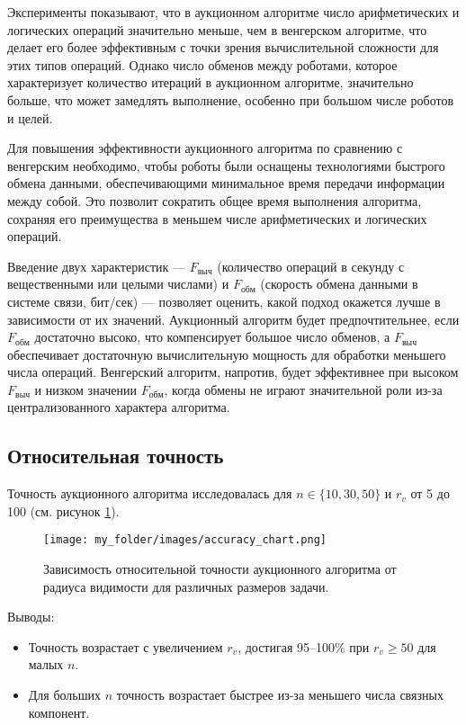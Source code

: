 \vspace{0.3cm}

Эксперименты показывают, что в аукционном алгоритме число арифметических и логических операций значительно меньше, чем в венгерском алгоритме, что делает его более эффективным с точки зрения вычислительной сложности для этих типов операций. Однако число обменов между роботами, которое характеризует количество итераций в аукционном алгоритме, значительно больше, что может замедлять выполнение, особенно при большом числе роботов и целей.

Для повышения эффективности аукционного алгоритма по сравнению с венгерским необходимо, чтобы роботы были оснащены технологиями быстрого обмена данными, обеспечивающими минимальное время передачи информации между собой. Это позволит сократить общее время выполнения алгоритма, сохраняя его преимущества в меньшем числе арифметических и логических операций.

Введение двух характеристик — \( F_{\text{выч}} \) (количество операций в секунду с вещественными или целыми числами) и \( F_{\text{обм}} \) (скорость обмена данными в системе связи, бит/сек) — позволяет оценить, какой подход окажется лучше в зависимости от их значений. Аукционный алгоритм будет предпочтительнее, если \( F_{\text{обм}} \) достаточно высоко, что компенсирует большое число обменов, а \( F_{\text{выч}} \) обеспечивает достаточную вычислительную мощность для обработки меньшего числа операций. Венгерский алгоритм, напротив, будет эффективнее при высоком \( F_{\text{выч}} \) и низком значении \( F_{\text{обм}} \), когда обмены не играют значительной роли из-за централизованного характера алгоритма.



\subsection{Относительная точность}
Точность аукционного алгоритма исследовалась для \( n \in \{10, 30, 50\} \) и \( r_v \) от 5 до 100 (см. рисунок \ref{fig:accuracy_chart}).

\begin{figure}[h]
    \centering
    \texttt{[image: my\_folder/images/accuracy\_chart.png]}
    \caption{Зависимость относительной точности аукционного алгоритма от радиуса видимости для различных размеров задачи.}
    \label{fig:accuracy_chart}
\end{figure}

Выводы:
\begin{itemize}
    \item Точность возрастает с увеличением \( r_v \), достигая 95--100\% при \( r_v \geq 50 \) для малых \( n \).
    \item Для больших \( n \) точность возрастает быстрее из-за меньшего числа связных компонент.
\end{itemize}

